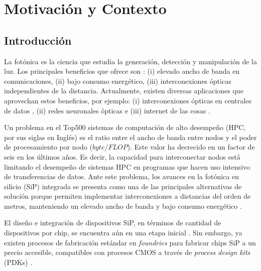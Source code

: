 \chapter{Motivación y Contexto}\label{chapter:introduction}

\section{Introducción}

La fotónica es la ciencia que estudia la generación, detección y manipulación de la luz. 
Los principales beneficios que ofrece son \citep{Shen2019}:
(i) elevado ancho de banda en comunicaciones, 
(ii) bajo consumo energético,
(iii) interconexiones ópticas independientes de la distancia.
Actualmente, existen diversas aplicaciones que aprovechan estos beneficios, por ejemplo:
(i) interconexiones ópticas en centrales de datos \citep{Shen2019},
(ii) redes neuronales ópticas \citep{Shen2017} e
(iii) internet de las cosas \citep{Li2021}.


Un problema en el Top500 sistemas de computación de alto desempeño (HPC, por sus siglas en Inglés) 
es el ratio entre el ancho de banda entre nodos y el poder de procesamiento por nodo ($byte / FLOP$).
Este valor ha decrecido en un factor de seis en los últimos años.
Es decir, la capacidad para interconectar nodos está
limitando el desempeño de sistemas HPC en programas que hacen uso intensivo de transferencias de datos.
Ante este problema, los avances en la fotónica en silicio (SiP) integrada se presenta como una de las
principales alternativas de solución porque permiten implementar interconexiones a distancias del orden de metros,
manteniendo un elevado ancho de banda y bajo consumo energético \citep{Shen2019, Anderson2018}.

El diseño e integración de dispositivos SiP, en términos
de cantidad de dispositivos por chip, se encuentra aún en una etapa inicial
\citep{LukasChrostowski2010, Glick2018}.
Sin embargo, ya existen procesos de fabricación estándar en \emph{foundries}
para fabricar chips SiP a un precio accesible, compatibles con procesos CMOS
a través de \emph{process design kits} (PDKs) \citep{Bogaerts2018}.



